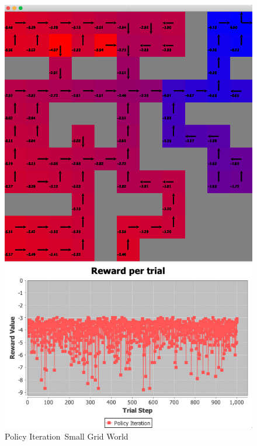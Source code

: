 \documentclass[11pt]{article}
\newcommand{\problemone}{Small Grid World}
\begin{document}
    \begin{figure}
        \begin{minipage}{0.5\textwidth}
            \centering
            \includegraphics[width=1\linewidth]{smallgridworld.png}
            \caption{Small Grid World}\label{Fig:Small Grid World}
        \end{minipage}
        \begin{minipage}{0.5\textwidth}
            \centering
            \includegraphics[width=0.99\linewidth]{policyiterationreward.png}
            \caption{Policy Iteration~\problemone}\label{Fig:Policy Iteration~\problemone}
        \end{minipage}
    \end{figure}
\end{document}
